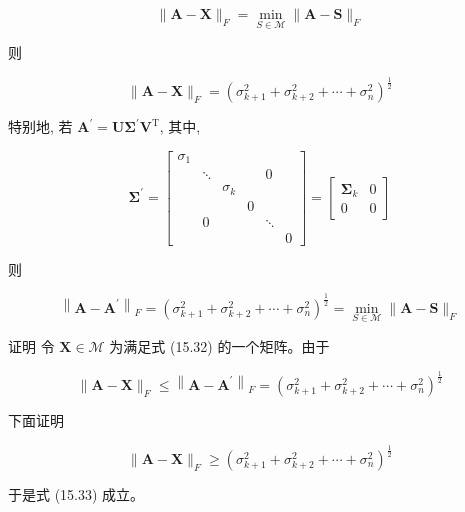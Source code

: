 \documentclass[10pt]{article}
\begin{document}
\begin{equation*}
\|\boldsymbol{A}-\boldsymbol{X}\|_{F}=\min _{S \in \mathcal{M}}\|\boldsymbol{A}-\boldsymbol{S}\|_{F} \tag{15.32}
\end{equation*}


则


\begin{equation*}
\|\boldsymbol{A}-\boldsymbol{X}\|_{F}=\left(\sigma_{k+1}^{2}+\sigma_{k+2}^{2}+\cdots+\sigma_{n}^{2}\right)^{\frac{1}{2}} \tag{15.33}
\end{equation*}


特别地, 若 $\boldsymbol{A}^{\prime}=\boldsymbol{U} \boldsymbol{\Sigma}^{\prime} \boldsymbol{V}^{\mathrm{T}}$, 其中,

$$
\boldsymbol{\Sigma}^{\prime}=\left[\begin{array}{cccccc}
\sigma_{1} & & & & & \\
& \ddots & & & 0 & \\
& & \sigma_{k} & & & \\
& & & 0 & & \\
& 0 & & & \ddots & \\
& & & & & 0
\end{array}\right]=\left[\begin{array}{cc}
\boldsymbol{\Sigma}_{k} & 0 \\
0 & 0
\end{array}\right]
$$

则


\begin{equation*}
\left\|\boldsymbol{A}-\boldsymbol{A}^{\prime}\right\|_{F}=\left(\sigma_{k+1}^{2}+\sigma_{k+2}^{2}+\cdots+\sigma_{n}^{2}\right)^{\frac{1}{2}}=\min _{S \in \mathcal{M}}\|\boldsymbol{A}-\boldsymbol{S}\|_{F} \tag{15.34}
\end{equation*}


证明 令 $\boldsymbol{X} \in \mathcal{M}$ 为满足式 (15.32) 的一个矩阵。由于


\begin{equation*}
\|\boldsymbol{A}-\boldsymbol{X}\|_{F} \leqslant\left\|\boldsymbol{A}-\boldsymbol{A}^{\prime}\right\|_{F}=\left(\sigma_{k+1}^{2}+\sigma_{k+2}^{2}+\cdots+\sigma_{n}^{2}\right)^{\frac{1}{2}} \tag{15.35}
\end{equation*}


下面证明

$$
\|\boldsymbol{A}-\boldsymbol{X}\|_{F} \geqslant\left(\sigma_{k+1}^{2}+\sigma_{k+2}^{2}+\cdots+\sigma_{n}^{2}\right)^{\frac{1}{2}}
$$

于是式 (15.33) 成立。
\end{document}
